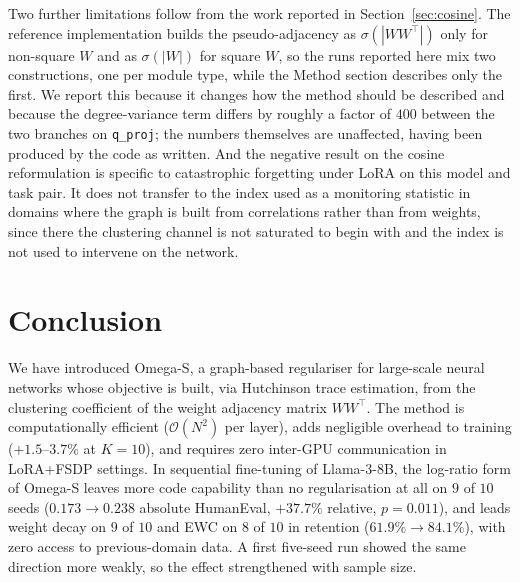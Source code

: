 \documentclass[11pt,a4paper]{article}
\begin{document}
Two further limitations follow from the work reported in
Section~\ref{sec:cosine}. The reference implementation builds the
pseudo-adjacency as $\sigma(|WW^\top|)$ only for non-square $W$ and as
$\sigma(|W|)$ for square $W$, so the runs reported here mix two constructions,
one per module type, while the Method section describes only the first. We
report this because it changes how the method should be described and because
the degree-variance term differs by roughly a factor of $400$ between the two
branches on \texttt{q\_proj}; the numbers themselves are unaffected, having
been produced by the code as written. And the negative result on the cosine
reformulation is specific to catastrophic forgetting under LoRA on this model
and task pair. It does not transfer to the index used as a monitoring
statistic in domains where the graph is built from correlations rather than
from weights, since there the clustering channel is not saturated to begin
with and the index is not used to intervene on the network.

\section{Conclusion}

We have introduced Omega-S, a graph-based regulariser for large-scale
neural networks whose objective is built, via Hutchinson trace estimation,
from the clustering coefficient of the weight adjacency matrix $WW^\top$.
The method is computationally efficient ($\mathcal{O}(N^2)$ per layer),
adds negligible overhead to training ($+1.5$--$3.7\%$ at $K{=}10$), and
requires zero inter-GPU communication in LoRA+FSDP settings. In sequential
fine-tuning of Llama-3-8B, the log-ratio form of Omega-S leaves more code
capability than no regularisation at all on $9$ of $10$ seeds
($0.173\to0.238$ absolute HumanEval, $+37.7\%$ relative, $p=0.011$), and leads
weight decay on $9$ of $10$ and EWC on $8$ of $10$ in retention
($61.9\%\to84.1\%$), with zero access to previous-domain data. A first
five-seed run showed the same direction more weakly, so the effect
strengthened with sample size.
\end{document}
